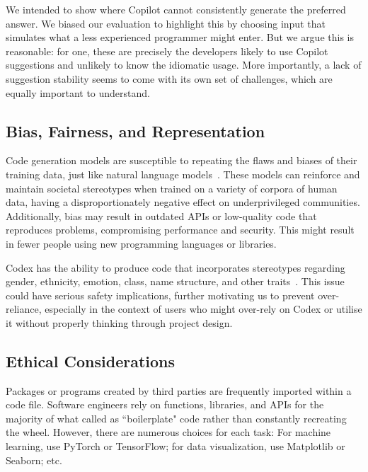We intended to show where Copilot cannot consistently generate the preferred answer. We biased our evaluation to highlight this by choosing input that simulates what a less experienced programmer might enter. 
But we argue this is reasonable: for one, these are precisely the developers likely to use Copilot suggestions and unlikely to know the idiomatic usage.
More importantly, a lack of suggestion stability seems to come with its own set of challenges, which are equally important to understand.

\subsection{Bias, Fairness, and Representation}
Code generation models are susceptible to repeating the flaws and biases of their training data, just like natural language models~\cite{Gpt3}. These models can reinforce and maintain societal stereotypes when trained on a variety of corpora of human data, having a disproportionately negative effect on underprivileged communities. 
Additionally, bias may result in outdated APIs or low-quality code that reproduces problems, compromising performance and security. This might result in fewer people using new programming languages or libraries.

Codex has the ability to produce code that incorporates stereotypes regarding gender, ethnicity, emotion, class, name structure, and other traits~\cite{copilot}.
This issue could have serious safety implications, further motivating us to prevent over-reliance, especially in the context of users who might over-rely on Codex or utilise it without properly thinking through project design.

%

\subsection{Ethical Considerations}
\label{ethics}
Packages or programs created by third parties are frequently imported within a code file. Software engineers rely on functions, libraries, and APIs for the majority of what called as ``boilerplate" code rather than constantly recreating the wheel. 
However, there are numerous choices for each task: For machine learning, use PyTorch or TensorFlow; for data visualization, use Matplotlib or Seaborn; etc.

